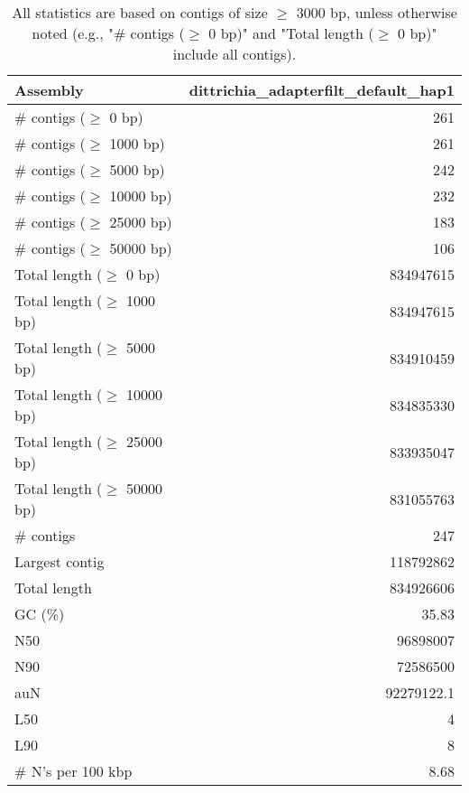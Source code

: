 \documentclass[12pt,a4paper]{article}
\begin{document}
\begin{table}[ht]
\begin{center}
\caption{All statistics are based on contigs of size $\geq$ 3000 bp, unless otherwise noted (e.g., "\# contigs ($\geq$ 0 bp)" and "Total length ($\geq$ 0 bp)" include all contigs).}
\begin{tabular}{|l*{1}{|r}|}
\hline
Assembly & dittrichia\_adapterfilt\_default\_hap1 \\ \hline
\# contigs ($\geq$ 0 bp) & 261 \\ \hline
\# contigs ($\geq$ 1000 bp) & 261 \\ \hline
\# contigs ($\geq$ 5000 bp) & 242 \\ \hline
\# contigs ($\geq$ 10000 bp) & 232 \\ \hline
\# contigs ($\geq$ 25000 bp) & 183 \\ \hline
\# contigs ($\geq$ 50000 bp) & 106 \\ \hline
Total length ($\geq$ 0 bp) & 834947615 \\ \hline
Total length ($\geq$ 1000 bp) & 834947615 \\ \hline
Total length ($\geq$ 5000 bp) & 834910459 \\ \hline
Total length ($\geq$ 10000 bp) & 834835330 \\ \hline
Total length ($\geq$ 25000 bp) & 833935047 \\ \hline
Total length ($\geq$ 50000 bp) & 831055763 \\ \hline
\# contigs & 247 \\ \hline
Largest contig & 118792862 \\ \hline
Total length & 834926606 \\ \hline
GC (\%) & 35.83 \\ \hline
N50 & 96898007 \\ \hline
N90 & 72586500 \\ \hline
auN & 92279122.1 \\ \hline
L50 & 4 \\ \hline
L90 & 8 \\ \hline
\# N's per 100 kbp & 8.68 \\ \hline
\end{tabular}
\end{center}
\end{table}
\end{document}
